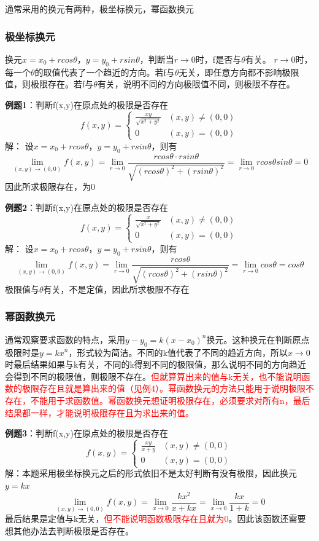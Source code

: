 \documentclass{article}
\begin{document}
通常采用的换元有两种，极坐标换元，幂函数换元
\subsubsection{极坐标换元}
换元$x=x_0+rcos\theta$，$y=y_0+rsin\theta$，判断当$r \rightarrow 0$时，f是否与$\theta$有关。
$r \rightarrow 0$时，每一个$\theta$的取值代表了一个趋近的方向。若f与$\theta$无关，即任意方向都不影响极限值，则极限存在。若f与$\theta$有关，说明不同的方向极限值不同，则极限不存在。

\textbf{例题1}：判断f(x,y)在原点处的极限是否存在
\[f(x,y)= \begin{cases} \frac{xy}{ \sqrt{x^2+y^2} }  & (x,y) \neq (0,0)\\0 & (x,y) = (0,0)\end{cases}\]
\quad \quad 解：
设$x=x_0+rcos\theta$，$y=y_0+rsin\theta$，则有
\[\lim\limits_{(x,y) \rightarrow (0,0)}f(x,y)=  
\lim\limits_{r \rightarrow 0}  \frac{rcos\theta  \cdot rsin\theta}{ \sqrt{(rcos\theta)^2+(rsin\theta)^2} }= 
\lim\limits_{r \rightarrow 0}rcos\theta sin\theta = 0\]
因此所求极限存在，为0

\textbf{例题2}：判断f(x,y)在原点处的极限是否存在
\[f(x,y)= \begin{cases} \frac{x}{ \sqrt{x^2+y^2} }  & (x,y) \neq (0,0)\\0 & (x,y) = (0,0)\end{cases}\]
\quad \quad 解：
设$x=x_0+rcos\theta$，$y=y_0+rsin\theta$，则有
\[\lim\limits_{(x,y) \rightarrow (0,0)}f(x,y)=  
\lim\limits_{r \rightarrow 0}  \frac{rcos\theta}{ \sqrt{(rcos\theta)^2+(rsin\theta)^2} }= 
\lim\limits_{r \rightarrow 0}cos\theta = cos\theta\]
极限值与$\theta$有关，不是定值，因此所求极限不存在

\subsubsection{幂函数换元}
通常观察要求函数的特点，采用$y-y_0=k(x-x_0)^n$换元。这种换元在判断原点极限时是$y=kx^n$，形式较为简洁。不同的k值代表了不同的趋近方向，所以$x \rightarrow 0$时最后结果如果与k有关，不同的k得到不同的极限值，那么说明不同的方向趋近会得到不同的极限值，则极限不存在。\textcolor{red}{但就算算出来的值与k无关，也不能说明函数的极限存在且就是算出来的值（见例4）。幂函数换元的方法只能用于说明极限不存在，不能用于求函数值。幂函数换元想证明极限存在，必须要求对所有n，最后结果都一样，才能说明极限存在且为求出来的值。}

\textbf{例题3}：判断f(x,y)在原点处的极限是否存在
\[f(x,y)= \begin{cases} \frac{xy}{ x+y }  & (x,y) \neq (0,0)\\0 & (x,y) = (0,0)\end{cases}\]
\quad \quad 解：本题采用极坐标换元之后的形式依旧不是太好判断有没有极限，因此换元$y=kx$
\[\lim\limits_{(x,y) \rightarrow (0,0)}f(x,y)=  
\lim\limits_{x \rightarrow 0}  \frac{kx^2}{x+kx}= 
\lim\limits_{x \rightarrow 0}  \frac{kx}{1+k}  = 0\]
最后结果是定值与k无关，\textcolor{red}{但不能说明函数极限存在且就为0}。因此该函数还需要想其他办法去判断极限是否存在。
\end{document}
